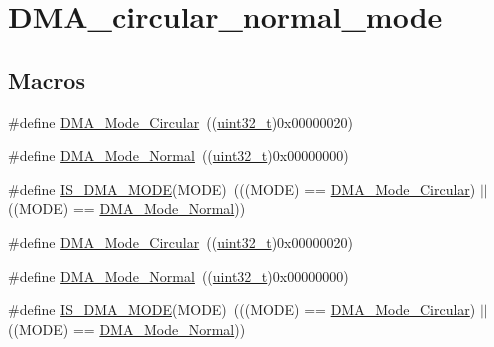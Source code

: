\hypertarget{group___d_m_a__circular__normal__mode}{}\section{D\+M\+A\+\_\+circular\+\_\+normal\+\_\+mode}
\label{group___d_m_a__circular__normal__mode}
\subsection*{Macros}
\begin{DoxyCompactItemize}
\item 
\#define \hyperlink{group___d_m_a__circular__normal__mode_ga36327b14c302098fbc5823ac3f1ae020}{D\+M\+A\+\_\+\+Mode\+\_\+\+Circular}~((\hyperlink{_p_e___types_8h_a33594304e786b158f3fb30289278f5af}{uint32\+\_\+t})0x00000020)
\item 
\#define \hyperlink{group___d_m_a__circular__normal__mode_ga36400f5b5095f1102ede4760d7a5959c}{D\+M\+A\+\_\+\+Mode\+\_\+\+Normal}~((\hyperlink{_p_e___types_8h_a33594304e786b158f3fb30289278f5af}{uint32\+\_\+t})0x00000000)
\item 
\#define \hyperlink{group___d_m_a__circular__normal__mode_gad88ee5030574d6a573904378fb62c7ac}{I\+S\+\_\+\+D\+M\+A\+\_\+\+M\+O\+DE}(M\+O\+DE)~(((M\+O\+DE) == \hyperlink{openmotestm_2library_2inc_2stm32f10x__dma_8h_a36327b14c302098fbc5823ac3f1ae020}{D\+M\+A\+\_\+\+Mode\+\_\+\+Circular}) $\vert$$\vert$ ((M\+O\+DE) == \hyperlink{openmotestm_2library_2inc_2stm32f10x__dma_8h_a36400f5b5095f1102ede4760d7a5959c}{D\+M\+A\+\_\+\+Mode\+\_\+\+Normal}))
\item 
\#define \hyperlink{group___d_m_a__circular__normal__mode_ga36327b14c302098fbc5823ac3f1ae020}{D\+M\+A\+\_\+\+Mode\+\_\+\+Circular}~((\hyperlink{_p_e___types_8h_a33594304e786b158f3fb30289278f5af}{uint32\+\_\+t})0x00000020)
\item 
\#define \hyperlink{group___d_m_a__circular__normal__mode_ga36400f5b5095f1102ede4760d7a5959c}{D\+M\+A\+\_\+\+Mode\+\_\+\+Normal}~((\hyperlink{_p_e___types_8h_a33594304e786b158f3fb30289278f5af}{uint32\+\_\+t})0x00000000)
\item 
\#define \hyperlink{group___d_m_a__circular__normal__mode_gad88ee5030574d6a573904378fb62c7ac}{I\+S\+\_\+\+D\+M\+A\+\_\+\+M\+O\+DE}(M\+O\+DE)~(((M\+O\+DE) == \hyperlink{openmotestm_2library_2inc_2stm32f10x__dma_8h_a36327b14c302098fbc5823ac3f1ae020}{D\+M\+A\+\_\+\+Mode\+\_\+\+Circular}) $\vert$$\vert$ ((M\+O\+DE) == \hyperlink{openmotestm_2library_2inc_2stm32f10x__dma_8h_a36400f5b5095f1102ede4760d7a5959c}{D\+M\+A\+\_\+\+Mode\+\_\+\+Normal}))
\end{DoxyCompactItemize}


